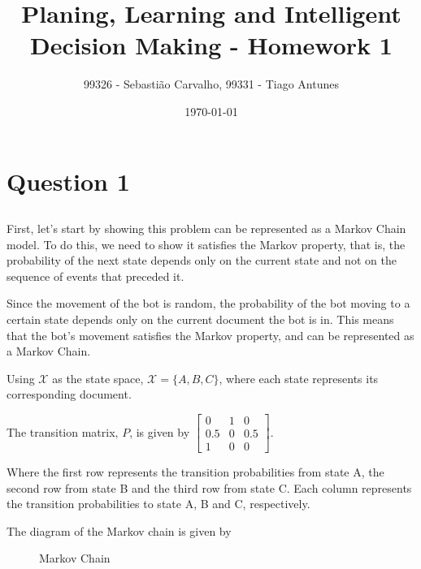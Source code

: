 \documentclass{article}
\title{Planing, Learning and Intelligent Decision Making - Homework 1}
\author{99326 - Sebastião Carvalho, 99331 - Tiago Antunes}
\date{\today}
\begin{document}
\maketitle

\tableofcontents

\section{Question 1}

\subsection{}

First, let's start by showing this problem can be represented as a Markov Chain model. To do this, we need to show it
satisfies the Markov property, that is, the probability of the next state depends only on the current state and not on the
sequence of events that preceded it.

\bigskip

Since the movement of the bot is random, the probability of the bot moving to a certain state depends only on the current document
the bot is in. This means that the bot's movement satisfies the Markov property, and can be represented as a Markov Chain.

\bigskip

Using $\mathcal{X}$ as the state space, $\mathcal{X} = \{ A, B, C\}$, where each state represents its corresponding document.

\bigskip

The transition matrix, $P$, is given by
$
\begin{bmatrix}
    0 & 1 & 0 \\
    0.5 & 0 & 0.5 \\
    1 & 0 & 0
\end{bmatrix}
$.

\bigskip

Where the first row represents the transition probabilities from state A, the second row from state B and the third row from state C.
Each column represents the transition probabilities to state A, B and C, respectively.

\bigskip

The diagram of the Markov chain is given by

\begin{figure}
    \centering
    \caption{Markov Chain}
    \label{fig: markov_chain}
\end{figure}
\end{document}
